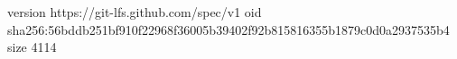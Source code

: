 version https://git-lfs.github.com/spec/v1
oid sha256:56bddb251bf910f22968f36005b39402f92b815816355b1879c0d0a2937535b4
size 4114
